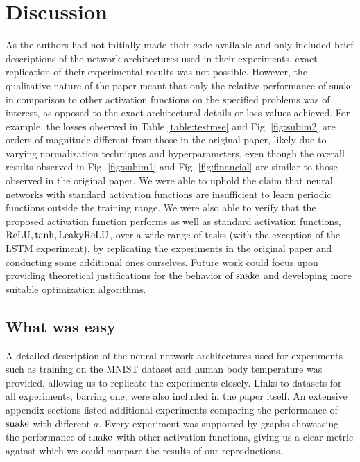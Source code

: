 \section{Discussion}

As the authors had not initially made their code available and only included brief descriptions of the network architectures used in their experiments, exact replication of their experimental results was not possible. However, the qualitative nature of the paper meant that only the relative performance of $ \operatorname{snake} $ in comparison to other activation functions on the specified problems was of interest, as opposed to the exact architectural details or loss values achieved. For example, the losses observed in Table \ref{table:testmse} and Fig. \ref{fig:subim2} are orders of magnitude different from those in the original paper, likely due to varying normalization techniques and hyperparameters, even though the overall results observed in Fig. \ref{fig:subim1} and Fig. \ref{fig:financial} are similar to those observed in the original paper. We were able to uphold the claim that neural networks with standard activation functions are insufficient to learn periodic functions outside the training range. We were also able to verify that the proposed activation function performs as well as standard activation functions, $ \operatorname{ReLU}, \tanh, \operatorname{LeakyReLU} $, over a wide range of tasks (with the exception of the LSTM experiment), by replicating the experiments in the original paper and conducting some additional ones ourselves. Future work could focus upon providing theoretical justifications for the behavior of $ \operatorname{snake} $ and developing more suitable optimization algorithms.


\subsection{What was easy}

A detailed description of the neural network architectures used for experiments such as training on the MNIST dataset and human body temperature was provided, allowing us to replicate the experiments closely. Links to datasets for all experiments, barring one, were also included in the paper itself. An extensive appendix sections listed additional experiments comparing the performance of $ \operatorname{snake} $ with different $a$. Every experiment was supported by graphs showcasing the performance of $ \operatorname{snake} $ with other activation functions, giving us a clear metric against which we could compare the results of our reproductions.

